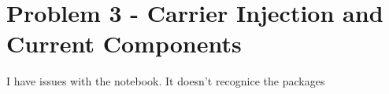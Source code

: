 \section{Problem 3 - Carrier Injection and Current Components}
I have issues with the notebook. It doesn't recognice the packages